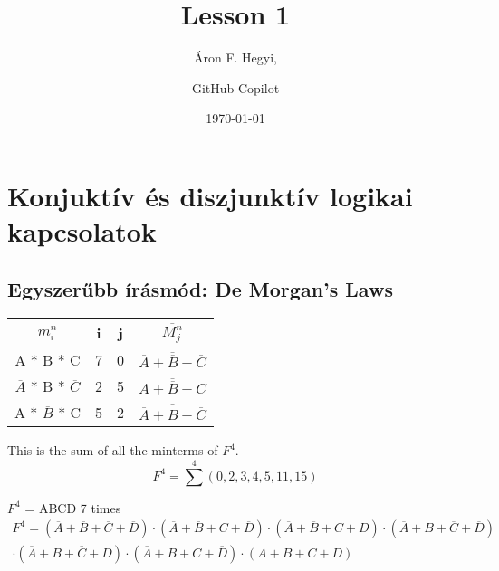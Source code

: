 \documentclass{article}
\title{Lesson 1}
\date{\today}
\author{Áron F. Hegyi,
\and GitHub Copilot}
\begin{document}
\maketitle

\section{Konjuktív és diszjunktív logikai kapcsolatok}

\subsection{Egyszerűbb írásmód: De Morgan's Laws}

\begin{table}[ht]
    \begin{tabular}{|c|c|c|c|}
        \hline
        \textbf{\(m_i^n\)}                      & \textbf{i} & \textbf{j} & \textbf{\(\overline{M_j^n}\)}                             \\
        \hline
        A * B * C                               & 7          & 0          & \(\overline{\overline{A} + \overline{B} + \overline{C}}\) \\
        \hline
        \(\overline{A}\) * B * \(\overline{C}\) & 2          & 5          & \(\overline{A + \overline{B} + C}\)                       \\
        \hline
        A * \(\overline{B}\) * C                & 5          & 2          & \(\overline{\overline{A} + B + \overline{C}}\)            \\
        \hline
    \end{tabular}
\end{table}

This is the sum of all the minterms of \(F^4\).
\begin{equation*}
    F^4 = \sum^{4} (0, 2, 3, 4, 5, 11, 15)
\end{equation*}

\(F^4\) = ABCD 7 times
\begin{multline*}
    F^4 = (\overline{A} + \overline{B} + \overline{C} + \overline{D}) \cdot (\overline{A} + \overline{B} + C + \overline{D}) \cdot (\overline{A} + \overline{B} + C + D) \cdot (\overline{A} + B + \overline{C} + \overline{D}) \\ \cdot (\overline{A} + B + \overline{C} + D) \cdot (\overline{A} + B + C + \overline{D}) \cdot (A + B + C + D)
\end{multline*}
\end{document}
